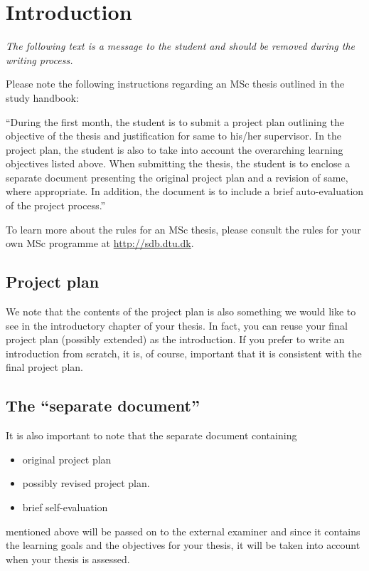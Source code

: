 \chapter{Introduction}

\textit{The following text is a message to the student and should be removed during the writing process.}

Please note the following instructions regarding an MSc thesis outlined in the study handbook: 

``During the first month, the student is to submit a project plan outlining the objective of the thesis and justification for same to his/her supervisor. In the project plan, the student is also to take into account the overarching learning objectives listed above. When submitting the thesis, the student is to enclose a separate document presenting the original project plan and a revision of same, where appropriate. In addition, the document is to include a brief auto-evaluation of the project process.''

To learn more about the rules for an MSc thesis, please consult the rules for your own MSc programme at \url{http://sdb.dtu.dk}.

\section{Project plan}
We note that the contents of the project plan is also something we would like to see in the introductory chapter of your thesis. In fact, you can reuse your final project plan (possibly extended) as the introduction. If you prefer to write an introduction from scratch, it is, of course, important that it is consistent with the final project plan.

\section{The ``separate document''}
It is also important to note that the separate document containing
\begin{itemize}
\item original project plan
\item possibly revised project plan. 
\item brief self-evaluation
\end{itemize}
mentioned above will be passed on to the external examiner and since it contains the learning goals and the objectives for your thesis, it will be taken into account when your thesis is assessed. 

